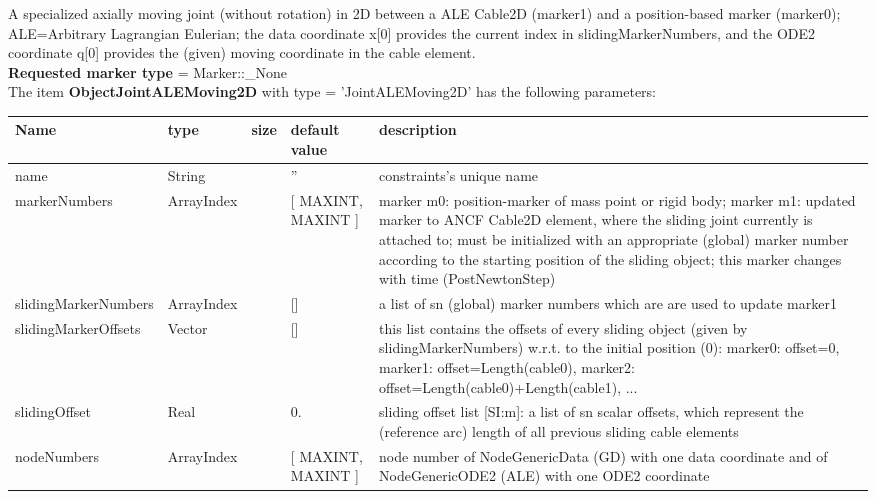 A specialized axially moving joint (without rotation) in 2D between a ALE Cable2D (marker1) and a position-based marker (marker0); ALE=Arbitrary Lagrangian Eulerian; the data coordinate x[0] provides the current index in slidingMarkerNumbers, and the ODE2 coordinate q[0] provides the (given) moving coordinate in the cable element.
 \\  {\bf Requested marker type} = Marker::\_None \\ 
\vspace{12pt} \noindent The item {\bf ObjectJointALEMoving2D} with type = 'JointALEMoving2D' has the following parameters:\vspace{-1cm}\\ 
\begin{center}
  \footnotesize
  \begin{longtable}{| p{4.5cm} | p{2.5cm} | p{0.5cm} | p{2.5cm} | p{6cm} |}
    \hline
    \bf Name & \bf type & \bf size & \bf default value & \bf description \\ \hline
    name &     String &      &     '' &     constraints's unique name\\ \hline
    markerNumbers &     ArrayIndex &      &     [ MAXINT, MAXINT ] &     marker m0: position-marker of mass point or rigid body; marker m1: updated marker to ANCF Cable2D element, where the sliding joint currently is attached to; must be initialized with an appropriate (global) marker number according to the starting position of the sliding object; this marker changes with time (PostNewtonStep)\\ \hline
    slidingMarkerNumbers &     ArrayIndex &      &     [] &     a list of sn (global) marker numbers which are are used to update marker1\\ \hline
    slidingMarkerOffsets &     Vector &      &     [] &     this list contains the offsets of every sliding object (given by slidingMarkerNumbers) w.r.t. to the initial position (0): marker0: offset=0, marker1: offset=Length(cable0), marker2: offset=Length(cable0)+Length(cable1), ...\\ \hline
    slidingOffset &     Real &      &     0. &     sliding offset list [SI:m]: a list of sn scalar offsets, which represent the (reference arc) length of all previous sliding cable elements\\ \hline
    nodeNumbers &     ArrayIndex &      &     [ MAXINT, MAXINT ] &     node number of NodeGenericData (GD) with one data coordinate and of NodeGenericODE2 (ALE) with one ODE2 coordinate\\ \hline

\end{longtable}
\end{center}
